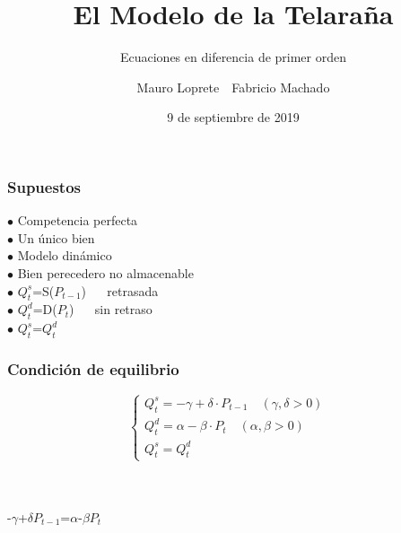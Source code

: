 \documentclass[11pt]{beamer}
\begin{document}
	\author{Mauro Loprete$\quad$Fabricio Machado}
	\title{El Modelo de la Telaraña}
	\subtitle{Ecuaciones en diferencia de primer orden}
	\date{9 de septiembre de 2019}
	\subject{Cálculo 3}
	\begin{frame}
	\maketitle
	\end{frame}
\begin{frame}
\frametitle{Supuestos}
	$\bullet$ Competencia perfecta
	\\
	$\bullet$ Un único bien
	\\
	$\bullet$ Modelo dinámico
	\\
	$\bullet$ Bien perecedero no almacenable
	\\
	$\bullet$ $Q^s_t$=S($P_{t-1}$) $\quad$ retrasada
	\\	
	$\bullet$ $Q^d_t$=D($P_t$) $\quad$  sin retraso
	\\
	$\bullet$ $Q^s_t$=$Q^d_t$
\end{frame}
\begin{frame}
\frametitle{Condición de equilibrio}
\begin{equation*}
\left\{\begin{matrix}
Q^{s}_{t}=-\gamma+\delta\cdot P_{t-1} \quad (\gamma,\delta >0)
	& \\ Q^{d}_{t}=\alpha-\beta\cdot P_{t}  \quad   (\alpha,\beta>0)
	& \\ Q^{s}_{t}=Q^{d}_{t}
\end{matrix}\right.
\end{equation*}
\\
~
\begin{block}{}
	\begin{center}
		-$\gamma$+$\delta$$P_{t-1}$=$\alpha$-$\beta$$P_t$
	\end{center}
\end{block}
\end{frame}
\end{document}
